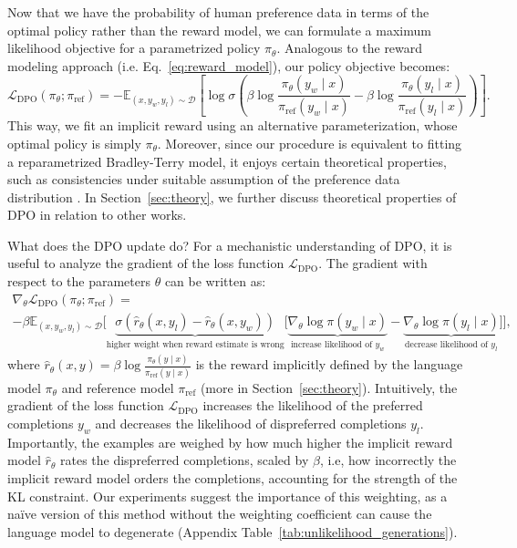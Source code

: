 \documentclass{article}
\begin{document}
Now that we have
the probability of human preference data in terms of the optimal policy rather than the reward model, we can formulate a maximum likelihood objective for a parametrized policy $\pi_\theta$. Analogous to the reward modeling approach (i.e. Eq.~\ref{eq:reward_model}), our policy objective becomes:
\begin{equation}\label{eq:optimum_model}
    \mathcal{L}_\text{DPO}(\pi_{\theta}; \pi_\text{ref}) = -\mathbb{E}_{(x, y_w, y_l)\sim \mathcal{D}}\left[\log \sigma \left(\beta \log \frac{\pi_{\theta}(y_w\mid x)}{\pi_\text{ref}(y_w\mid x)} - \beta \log \frac{\pi_{\theta}(y_l\mid x)}{\pi_\text{ref}(y_l\mid x)}\right)\right].
\end{equation}
This way, we fit an implicit reward using an alternative parameterization, whose optimal policy is simply $\pi_\theta$. Moreover, since our procedure is equivalent to fitting a reparametrized Bradley-Terry model, it enjoys certain theoretical properties, such as consistencies under suitable assumption of the preference data distribution \cite{bong2022generalized}. In Section~\ref{sec:theory}, we further discuss theoretical properties of DPO in relation to other works.

What does the DPO update do? For a mechanistic understanding of DPO, it is useful to analyze the gradient of the loss function $\mathcal{L}_\text{DPO}$. The gradient with respect to the parameters $\theta$ can be written as:
\begin{multline*}\label{eq:gradient}
    \nabla_\theta \mathcal{L}_\text{DPO}(\pi_\theta;\pi_\text{ref}) = \\ -\beta\mathbb{E}_{(x, y_w, y_l) \sim \mathcal{D}} \bigg[\underbrace{\sigma(\hat{r}_\theta(x, y_l) - \hat{r}_\theta (x, y_w))}_\text{higher weight when reward estimate is wrong}\bigg[\underbrace{\nabla_\theta\log \pi(y_w \mid x)}_\text{increase likelihood of $y_w$} - \underbrace{\nabla_\theta\log\pi(y_l \mid x)}_\text{decrease likelihood of $y_l$}\bigg]\bigg],
\end{multline*}
where $\hat{r}_\theta(x, y) = \beta \log \frac{\pi_\theta(y \mid x)}{\pi_\text{ref}(y \mid x)}$ is the reward implicitly defined by the language model $\pi_\theta$ and reference model $\pi_\text{ref}$ (more in Section~\ref{sec:theory}). Intuitively, the gradient of the loss function $\mathcal{L}_\text{DPO}$ increases the likelihood of the preferred completions $y_w$ and decreases the likelihood of dispreferred completions $y_l$. Importantly, the examples are weighed by how much higher the implicit reward model $\hat{r}_\theta$ rates the dispreferred completions, scaled by $\beta$, i.e, how incorrectly the implicit reward model orders the completions, accounting for the strength of the KL constraint. Our experiments suggest the importance of this weighting, as a na\"ive version of this method without the weighting coefficient can cause the language model to degenerate (Appendix Table~\ref{tab:unlikelihood_generations}).
\end{document}
